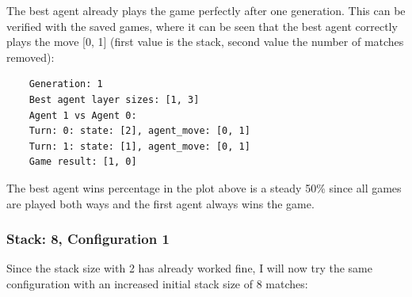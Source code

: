 \documentclass[11pt]{report}
\begin{document}
\begin{enumerate}
\begin{center}
    \end{center}

    The best agent already plays the game perfectly after one generation.
    This can be verified with the saved games, where it can be seen that the best agent correctly plays the move [0, 1] (first value is the stack, second value the number of matches removed):
    \begin{verbatim}
    Generation: 1
    Best agent layer sizes: [1, 3]
    Agent 1 vs Agent 0:
    Turn: 0: state: [2], agent_move: [0, 1]
    Turn: 1: state: [1], agent_move: [0, 1]
    Game result: [1, 0]
    \end{verbatim}
    The best agent wins percentage in the plot above is a steady 50\% since all games are played both ways and the first agent always wins the game.

    \subsubsection{Stack: 8, Configuration 1}
    Since the stack size with 2 has already worked fine, I will now try the same configuration with an increased initial stack size of 8 matches:
    \\
    \renewcommand{\csvpath}{../data/simple_nim/stack_8/t_1/stats.csv} %
    \begin{center}
\end{center}
\end{enumerate}
\end{document}
